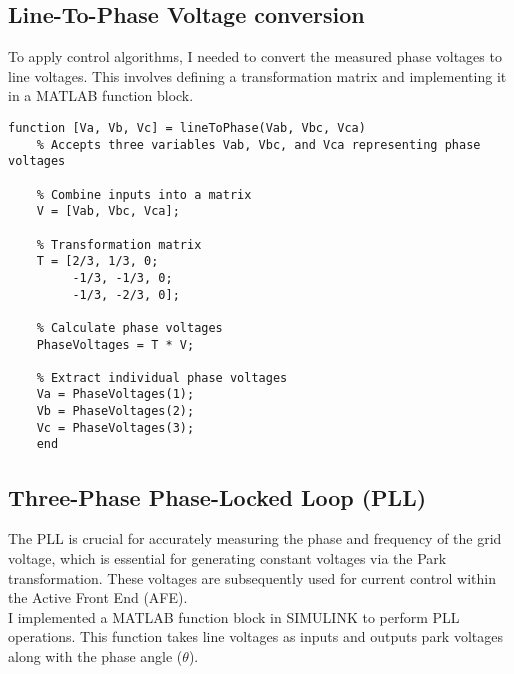 \subsection{Line-To-Phase Voltage conversion}
To apply control algorithms, I needed to convert the measured phase voltages to
line voltages. This involves defining a transformation matrix and implementing
it in a MATLAB function block.

\begin{lstlisting}[style=MATLAB, caption={Phase to Line voltage transformation function}, label={lst:matlab}]
    function [Va, Vb, Vc] = lineToPhase(Vab, Vbc, Vca)
    % Accepts three variables Vab, Vbc, and Vca representing phase voltages
    
    % Combine inputs into a matrix
    V = [Vab, Vbc, Vca];
    
    % Transformation matrix
    T = [2/3, 1/3, 0;
         -1/3, -1/3, 0;
         -1/3, -2/3, 0];
    
    % Calculate phase voltages
    PhaseVoltages = T * V;
    
    % Extract individual phase voltages
    Va = PhaseVoltages(1);
    Vb = PhaseVoltages(2);
    Vc = PhaseVoltages(3);
    end
\end{lstlisting}

\subsection{Three-Phase Phase-Locked Loop (PLL)}
The PLL is crucial for accurately measuring the phase and frequency of the grid
voltage, which is essential for generating constant voltages via the Park
transformation. These voltages are subsequently used for current control within
the Active Front End (AFE).\\

I implemented a MATLAB function block in SIMULINK to perform PLL operations.
This function takes line voltages as inputs and outputs park voltages along
with the phase angle ($\theta$).\\

